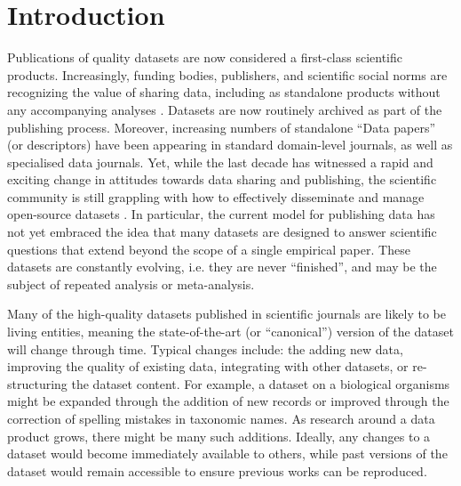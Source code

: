 \documentclass[a4paper,num-refs]{assets/oup-contemporary}
\begin{document}
\section{Introduction}

Publications of quality datasets are now considered a first-class scientific products. Increasingly, funding bodies, publishers, and scientific social norms are recognizing the value of sharing data, including as standalone products without any accompanying analyses \cite{Whitlock-2011,Fairbairn-2011,Piwowar-2011,VanNoorden-2013,Gibney-2013}. Datasets are now routinely archived as part of the publishing process. Moreover, increasing numbers of standalone ``Data papers'' (or descriptors) have been appearing in standard domain-level journals, as well as specialised data journals. Yet, while the last decade has witnessed a rapid and exciting change in attitudes towards data sharing and publishing, the scientific community is still grappling with how to effectively disseminate and manage open-source datasets \cite{Whitlock-2011, Goodman-2014, Lowndes-2017,Perkel-2016,VanNoorden-2013, Kratz-2015}. In particular, the current model for publishing data has not yet embraced the idea that many datasets are designed to answer scientific questions that extend beyond the scope of a single empirical paper. These datasets are constantly evolving, i.e. they are never ``finished'', and may be the subject of repeated analysis or meta-analysis.

Many of the high-quality datasets published in scientific journals are likely to be living entities, meaning the state-of-the-art (or ``canonical'') version of the dataset will change through time. Typical changes include: the adding new data, improving the quality of existing data, integrating with other datasets, or re-structuring the dataset content. For example, a dataset on a biological organisms might be expanded through the addition of new records or improved through the correction of spelling mistakes in taxonomic names. As research around a data product grows, there might be many such additions. Ideally, any changes to a dataset would become immediately available to others, while past versions of the dataset would remain accessible to ensure previous works can be reproduced.
\end{document}
